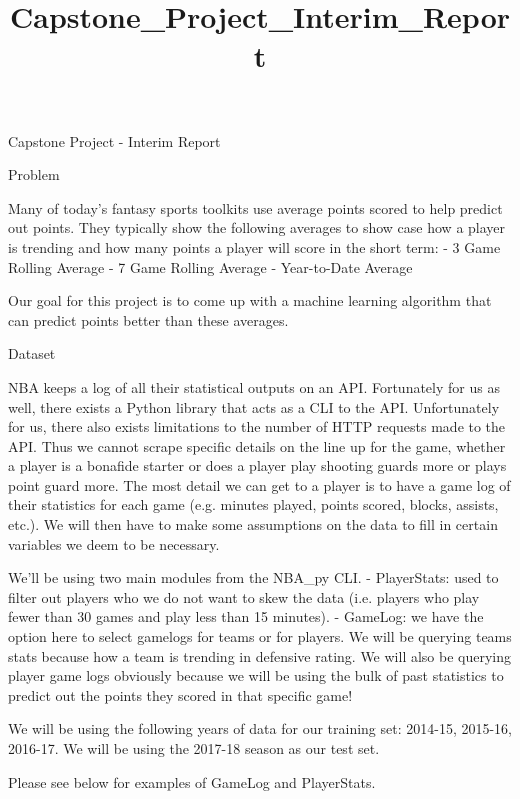\documentclass[11pt]{article}
\title{Capstone\_Project\_Interim\_Report}
\begin{document}
    
    
    \maketitle
    
    

    
    Capstone Project - Interim Report

Problem

Many of today's fantasy sports toolkits use average points scored to
help predict out points. They typically show the following averages to
show case how a player is trending and how many points a player will
score in the short term: - 3 Game Rolling Average - 7 Game Rolling
Average - Year-to-Date Average

Our goal for this project is to come up with a machine learning
algorithm that can predict points better than these averages.

    Dataset

NBA keeps a log of all their statistical outputs on an API. Fortunately
for us as well, there exists a Python library that acts as a CLI to the
API. Unfortunately for us, there also exists limitations to the number
of HTTP requests made to the API. Thus we cannot scrape specific details
on the line up for the game, whether a player is a bonafide starter or
does a player play shooting guards more or plays point guard more. The
most detail we can get to a player is to have a game log of their
statistics for each game (e.g. minutes played, points scored, blocks,
assists, etc.). We will then have to make some assumptions on the data
to fill in certain variables we deem to be necessary.

We'll be using two main modules from the NBA\_py CLI. - PlayerStats:
used to filter out players who we do not want to skew the data (i.e.
players who play fewer than 30 games and play less than 15 minutes). -
GameLog: we have the option here to select gamelogs for teams or for
players. We will be querying teams stats because how a team is trending
in defensive rating. We will also be querying player game logs obviously
because we will be using the bulk of past statistics to predict out the
points they scored in that specific game!

We will be using the following years of data for our training set:
2014-15, 2015-16, 2016-17. We will be using the 2017-18 season as our
test set.

Please see below for examples of GameLog and PlayerStats.
\end{document}
